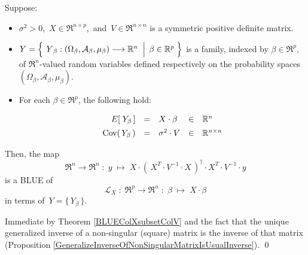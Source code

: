 
\begin{corollary}
\mbox{}
\vskip 0.1cm
\noindent
Suppose:
\begin{itemize}
\item
	$\sigma^{2} > 0$,
	\,$X \in \Re^{n \times p}$,\,
	and
	\,$V \in \Re^{n \times n}$ is a symmetric {\color{red}positive definite} matrix.
\item
	$Y = \left\{\;
		\left.
		\overset{{\color{white}.}}{Y}_{\beta} : (\Omega_{\beta},\mathcal{A}_{\beta},\mu_{\beta}) \longrightarrow \Re^{n}
		\;\;\right\vert\;
		\beta \in \Re^{p}
		\;\right\}$
	is a family, indexed by $\beta \in \Re^{p}$,
	of $\Re^{n}$-valued random variables defined respectively on the
	probability spaces $(\Omega_{\beta},\mathcal{A}_{\beta},\mu_{\beta})$.
\item
	For each $\beta \in \Re^{p}$, the following hold:
	\begin{equation*}
	\begin{array}{rclcl}
	E\!\left[\;Y_{\beta}\,\right] &  \overset{{\color{white}\vert}}{=} & X \cdot \beta & \in & \Re^{n}
	\\
	\Cov\!\left(\,Y_{\beta}\,\right) & \overset{{\color{white}\vert}}{=} & \sigma^{2} \cdot V & \in & \Re^{n \times n}
	\end{array}
	\end{equation*}
\end{itemize}
Then, {\color{red}the map
\begin{equation*}
\Re^{n} \longrightarrow \Re^{n}
\; : \; y \; \longmapsto \;
X \cdot \left(\,X^{T} \cdot V^{-1} \cdot X\,\right)^{\dagger} \cdot X^{T} \cdot V^{-1} \cdot y
\end{equation*}
is a BLUE of
\begin{equation*}
\mathcal{L}_{X} \; : \; \Re^{p} \longrightarrow \Re^{n} \; : \; \beta \; \longmapsto \; X \cdot \beta
\end{equation*}
in terms of
\,$Y = \{\,Y_{\beta}\,\}$.}
\end{corollary}
\proof
Immediate by Theorem \ref{BLUEColXsubsetColV} and the fact that
the unique generalized inverse of a non-singular (square) matrix is the
inverse of that matrix (Proposition \ref{GeneralizeInverseOfNonSingularMatrixIsUsualInverse}).
\qed

